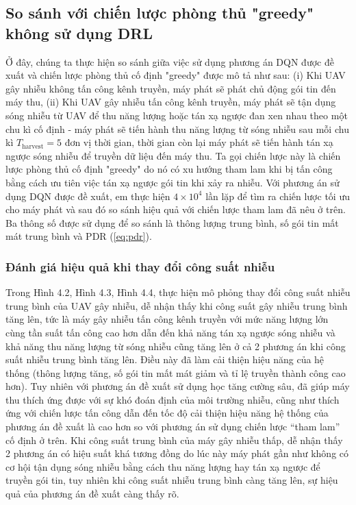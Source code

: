 \documentclass{uetgraduation}
\begin{document}
\subsection{So sánh với chiến lược phòng thủ "greedy" không sử dụng DRL}
Ở đây, chúng ta thực hiện so sánh giữa việc sử dụng phương án DQN được đề xuất và chiến lược phòng thủ cố định "greedy" được mô tả như sau: (i) Khi
UAV gây nhiễu không tấn công kênh truyền, máy phát sẽ phát chủ động gói tin đến máy thu, (ii) Khi UAV gây nhiễu tấn công kênh truyền, máy phát sẽ tận dụng
sóng nhiễu từ UAV để thu năng lượng hoặc tán xạ ngược đan xen nhau theo một chu kì cố định - máy phát sẽ tiến hành thu năng lượng từ sóng nhiễu sau mỗi chu kì
$T_\text{harvest} = 5$ đơn vị thời gian, thời gian còn lại máy phát sẽ tiến hành tán xạ ngược sóng nhiễu để truyền dữ liệu đến máy thu. Ta gọi chiến lược này
là chiến lược phòng thủ cố định "greedy" do nó có xu hướng tham lam khi bị tấn công bằng cách ưu tiên việc tán xạ ngược gói tin khi xảy ra nhiễu. Với phương án sử dụng DQN được đề xuất, 
em thực hiện $4 \times 10^4$ lần lặp để tìm ra chiến lược tối ưu cho máy phát và sau đó so sánh hiệu quả với chiến lược tham lam đã nêu ở trên. Ba thông số được sử dụng để so sánh là
thông lượng trung bình, số gói tin mất mát trung bình và PDR (\ref{eq:pdr}).

\subsubsection{Đánh giá hiệu quả khi thay đổi công suất nhiễu}
Trong Hình 4.2, Hình 4.3, Hình 4.4, thực hiện mô phỏng thay đổi công suất nhiễu trung bình của UAV gây nhiễu, dễ nhận thấy khi công suất gây nhiễu trung bình tăng lên, tức là
máy gây nhiễu tấn công kênh truyền với mức năng lượng lớn cùng tần suất tấn công cao hơn dẫn đến khả năng tán xạ ngược sóng nhiễu và khả năng thu năng lượng từ sóng nhiễu cũng tăng lên ở 
cả 2 phương án khi công suất nhiễu trung bình tăng lên. Điều này đã làm cải thiện hiệu năng của hệ thống (thông lượng tăng, số gói tin mất mát giảm và tỉ lệ truyền thành công cao hơn). Tuy nhiên 
với phương án đề xuất sử dụng học tăng cường sâu, đã giúp máy thu thích ứng được với sự khó đoán định của môi trường nhiễu, cũng như thích ứng với chiến lược tấn công dẫn đến tốc độ 
cải thiện hiệu năng hệ thống của phương án đề xuất là cao hơn so với phương án sử dụng chiến lược “tham lam” cố định ở trên. Khi công suất trung bình của máy 
gây nhiễu thấp, dễ nhận thấy 2 phương án có hiệu suất khá tương đồng do lúc này máy phát gần như không có cơ hội tận dụng sóng nhiễu bằng cách thu năng lượng hay tán xạ ngược để truyền gói tin, 
tuy nhiên khi công suất nhiễu trung bình càng tăng lên, sự hiệu quả của phương án đề xuất càng thấy rõ.
\end{document}
